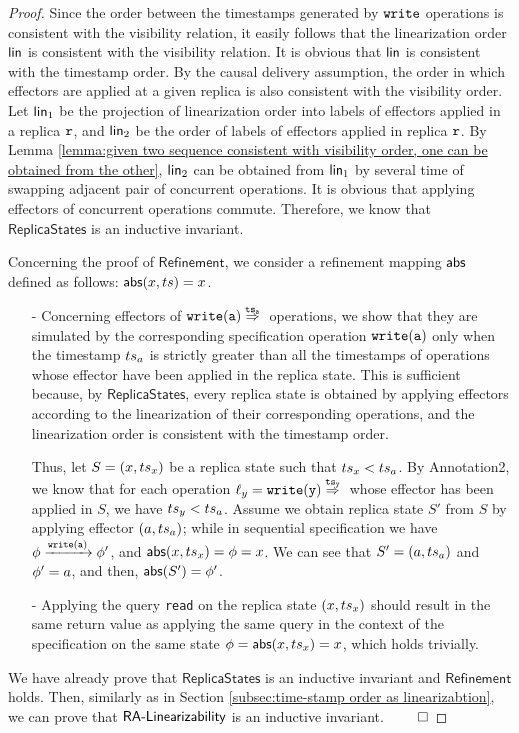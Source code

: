 \begin {proof}
Since the order between the timestamps generated by ${\tt write}$ operations is consistent with the visibility relation, it easily follows that the linearization order $\mathsf{lin}$ is consistent with the visibility relation. It is obvious that $\mathsf{lin}$ is consistent with the timestamp order. By the causal delivery assumption, the order in which effectors are applied at a given replica is also consistent with the visibility order. Let $\mathsf{lin}_1$ be the projection of linearization order into labels of effectors applied in a replica $\mathtt{r}$, and $\mathsf{lin}_2$ be the order of labels of effectors applied in replica $\mathtt{r}$. By Lemma \ref{lemma:given two sequence consistent with visibility order, one can be obtained from the other}, $\mathsf{lin}_2$ can be obtained from $\mathsf{lin}_1$ by several time of swapping adjacent pair of concurrent operations. It is obvious that applying effectors of concurrent operations commute. Therefore, we know that $\mathsf{ReplicaStates}$ is an inductive invariant.

Concerning the proof of $\mathsf{Refinement}$, we consider a refinement mapping $\mathsf{abs}$ defined as follows: $\mathsf{abs}(x,ts) = x$.

\begin{itemize}
\setlength{\itemsep}{0.5pt}
\item[-] Concerning effectors of $\alabellongind[{\tt write}]{a}{}{\ats_a}{}$ operations, we show that they are simulated by the corresponding specification operation $\alabelshort[{\tt write}]{a}$ only when the timestamp $ts_a$ is strictly greater than all the timestamps of operations whose effector have been applied in the replica state. This is sufficient because, by $\mathsf{ReplicaStates}$, every replica state is obtained by applying effectors according to the linearization of their corresponding operations, and the linearization order is consistent with the timestamp order.

    Thus, let $S = (x,ts_x)$ be a replica state such that $ts_x < ts_a$. By Annotation2, we know that for each operation $\alabel_y = \alabellongind[{\tt write}]{y}{}{\ats_y}{}$ whose effector has been applied in $S$, we have $ts_y < ts_a$. Assume we obtain replica state $S'$ from $S$ by applying effector $(a,ts_a)$; while in sequential specification we have $\abstate \xrightarrow{\alabelshort[{\tt write}]{a}} \abstate'$, and $\mathsf{abs}(x,ts_x) = \phi = x$. We can see that $S' = (a,ts_a)$ and $\phi' = a$, and then, $\mathsf{abs}(S') = \phi'$.

\item[-] Applying the query {\tt read} on the replica state $(x,ts_x)$ should result in the same return value as applying the same query in the context of the specification on the same state $\phi = \mathsf{abs}(x,ts_x) = x$, which holds trivially.
\end{itemize}


We have already prove that $\mathsf{ReplicaStates}$ is an inductive invariant and $\mathsf{Refinement}$ holds. Then, similarly as in Section \ref{subsec:time-stamp order as linearizabtion}, we can prove that $\mathsf{RA\text{-}Linearizability{}}$ is an inductive invariant. $\qed$
\end {proof}
